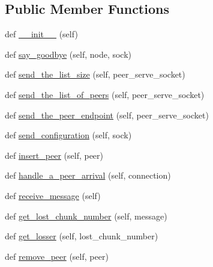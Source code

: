\subsection*{Public Member Functions}
\begin{DoxyCompactItemize}
\item 
def \hyperlink{classsrc_1_1core_1_1splitter__dbs_1_1Splitter__DBS_a125ba814f93efe1c5f0e43ba9969307e}{\+\_\+\+\_\+init\+\_\+\+\_\+} (self)
\item 
def \hyperlink{classsrc_1_1core_1_1splitter__dbs_1_1Splitter__DBS_abec8f0d525b4a0e226c20faab6999098}{say\+\_\+goodbye} (self, node, sock)
\item 
def \hyperlink{classsrc_1_1core_1_1splitter__dbs_1_1Splitter__DBS_a6c48f8c160861a802e48cc5fbfd5a8c0}{send\+\_\+the\+\_\+list\+\_\+size} (self, peer\+\_\+serve\+\_\+socket)
\item 
def \hyperlink{classsrc_1_1core_1_1splitter__dbs_1_1Splitter__DBS_a3bc94592bc0da6369a4dcab306f2ea52}{send\+\_\+the\+\_\+list\+\_\+of\+\_\+peers} (self, peer\+\_\+serve\+\_\+socket)
\item 
def \hyperlink{classsrc_1_1core_1_1splitter__dbs_1_1Splitter__DBS_ad1f00dcc5c5c0b13b6c0d246903d4542}{send\+\_\+the\+\_\+peer\+\_\+endpoint} (self, peer\+\_\+serve\+\_\+socket)
\item 
def \hyperlink{classsrc_1_1core_1_1splitter__dbs_1_1Splitter__DBS_af7c47014ad636ac10bce62cba7fd88e8}{send\+\_\+configuration} (self, sock)
\item 
def \hyperlink{classsrc_1_1core_1_1splitter__dbs_1_1Splitter__DBS_aca9ff707e7cc0a9a75396fdaf7c77bbb}{insert\+\_\+peer} (self, peer)
\item 
def \hyperlink{classsrc_1_1core_1_1splitter__dbs_1_1Splitter__DBS_a26eccfb34c0b1b506f1bb83d194fc6d3}{handle\+\_\+a\+\_\+peer\+\_\+arrival} (self, connection)
\item 
def \hyperlink{classsrc_1_1core_1_1splitter__dbs_1_1Splitter__DBS_a501a9d297e2ed2d776e4c087ab3c7622}{receive\+\_\+message} (self)
\item 
def \hyperlink{classsrc_1_1core_1_1splitter__dbs_1_1Splitter__DBS_a4dc67f4a285c696bcccf8f8b1e5f7444}{get\+\_\+lost\+\_\+chunk\+\_\+number} (self, message)
\item 
def \hyperlink{classsrc_1_1core_1_1splitter__dbs_1_1Splitter__DBS_afd4db338ba62ab8de3d7d0ae3b9cd76f}{get\+\_\+losser} (self, lost\+\_\+chunk\+\_\+number)
\item 
def \hyperlink{classsrc_1_1core_1_1splitter__dbs_1_1Splitter__DBS_a55e2b2b3648d428c6188a9dd54746adf}{remove\+\_\+peer} (self, peer)

\end{DoxyCompactItemize}
